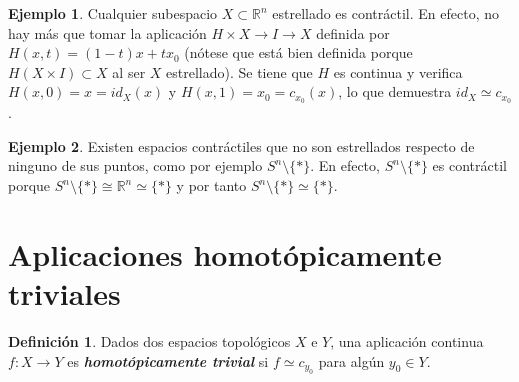 \documentclass[11pt]{report}
\newenvironment{cdefinition} %
  {\begin{mdframed}[innertopmargin = 0pt,
                    innerbottommargin = 7.5pt,
                    backgroundcolor = lightgray!10,
                    linewidth = 1pt,
                    shadow = true,
                    shadowsize = 5pt,
                    roundcorner = 0pt,
                    skipabove = 0pt]
    \begin{definition}}
  {\end{definition}\end{mdframed}}
\theoremstyle{definition}
\newtheorem{definition}{Definición}[chapter]
\theoremstyle{definition}
\newtheorem{example}{Ejemplo}[chapter]
\theoremstyle{remark}
\newcommand{\R}{\mathbb R}
\begin{document}
\begin{example}
Cualquier subespacio $X \subset \R^n$ estrellado es contráctil. En efecto, no hay más que tomar la aplicación $H \times X \to I \to X$ definida por $H(x,t) = (1-t)x+tx_0$ (nótese que está bien definida porque $H(X \times I) \subset X$ al ser $X$ estrellado). Se tiene que $H$ es continua y verifica $H(x,0) = x = id_X(x)$ y $H(x,1) = x_0 = c_{x_0}(x)$, lo que demuestra $id_X \simeq c_{x_0}$.
\end{example}

\begin{example}
Existen espacios contráctiles que no son estrellados respecto de ninguno de sus puntos, como por ejemplo $S^n \setminus \{\ast\}$. En efecto, $S^n \setminus \{\ast\}$ es contráctil porque $S^n \setminus \{\ast\} \cong \R^n \simeq \{\ast\}$ y por tanto $S^n \setminus \{\ast\} \simeq \{\ast\}$.
\end{example}

\section{Aplicaciones homotópicamente triviales}

\begin{cdefinition}
Dados dos espacios topológicos $X$ e $Y$, una aplicación continua $f \colon X \to Y$ es \textbf{\textit{homotópicamente trivial}} si $f \simeq c_{y_0}$ para algún $y_0 \in Y$.
\end{cdefinition}
\end{document}
